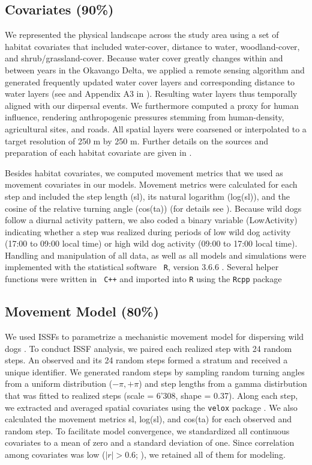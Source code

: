 \documentclass[abstract=on,10pt,a4paper,bibliography=totocnumbered]{article}
\begin{document}
\subsection{Covariates (90\%)}
We represented the physical landscape across the study area using a set of
habitat covariates that included water-cover, distance to water, woodland-cover,
and shrub/grassland-cover. Because water cover greatly changes within and
between years in the Okavango Delta, we applied a remote sensing algorithm and
generated frequently updated water cover layers and corresponding distance to
water layers (see \citealp{Wolski.2017} and Appendix A3 in
\citealp{Hofmann.2021}). Resulting water layers thus temporally aligned with our
dispersal events. We furthermore computed a proxy for human influence, rendering
anthropogenic pressures stemming from human-density, agricultural sites, and
roads. All spatial layers were coarsened or interpolated to a target resolution
of 250 m by 250 m. Further details on the sources and preparation of each
habitat covariate are given in \cite{Hofmann.2021}.

Besides habitat covariates, we computed movement metrics that we used as
movement covariates in our models. Movement metrics were calculated for each
step and included the step length (\textsf{sl}), its natural logarithm
(\textsf{log(sl)}), and the cosine of the relative turning angle
(\textsf{cos(ta)}) (for details see \citep{Avgar.2016, Fieberg.2020}). Because
wild dogs follow a diurnal activity pattern, we also coded a binary variable
(\textsf{LowActivity}) indicating whether a step was realized during periods of
low wild dog activity (17:00 to 09:00 local time) or high wild dog activity
(09:00 to 17:00 local time). Handling and manipulation of all data, as well as
all models and simulations were implemented with the statistical software {\tt
R}, version 3.6.6 \citep{R.2019}. Several helper functions were written in {\tt
C++} and imported into {\tt R} using the {\tt Rcpp} package
\citep{Eddelbuettel.2011, Eddelbuettel.2013}

\subsection{Movement Model (80\%)}
We used ISSFs to parametrize a mechanistic movement model for dispersing wild
dogs \citep{Avgar.2016}. To conduct ISSF analysis, we paired each realized step
with 24 random steps. An observed and its 24 random steps formed a stratum and
received a unique identifier. We generated random steps by sampling random
turning angles from a uniform distribution (\(-\pi, +\pi\)) and step lengths
from a gamma distirbution that was fitted to realized steps (scale = 6'308,
shape = 0.37). Along each step, we extracted and averaged spatial covariates
using the {\tt velox} package \citep{Hunziker.2021}. We also calculated the
movement metrics \textsf{sl}, \textsf{log(sl)}, and \textsf{cos(ta)} for each
observed and random step. To facilitate model convergence, we standardized all
continuous covariates to a mean of zero and a standard deviation of one. Since
correlation among covariates was low (\(|r| > 0.6\); \citealp{Latham.2011}), we
retained all of them for modeling.
\end{document}
